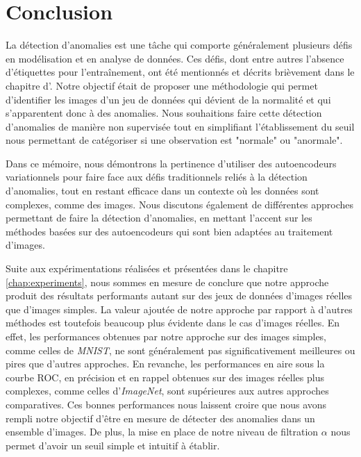 \chapter*{Conclusion}           %
\label{chap:conclusion}         %

La détection d'anomalies est une tâche qui comporte généralement plusieurs défis en modélisation et en analyse de données. Ces défis, dont entre autres l'absence d'étiquettes pour l'entraînement, ont été mentionnés et décrits brièvement dans le chapitre d'. Notre objectif était de proposer une méthodologie qui permet d'identifier les images d'un jeu de données qui dévient de la normalité et qui s'apparentent donc à des anomalies. Nous souhaitions faire cette détection d'anomalies de manière non supervisée tout en simplifiant l'établissement du seuil nous permettant de catégoriser si une observation est "normale" ou  "anormale". 

Dans ce mémoire, nous démontrons la pertinence d'utiliser des autoencodeurs variationnels pour faire face aux défis traditionnels reliés à la détection d'anomalies, tout en restant efficace dans un contexte où les données sont complexes, comme des images. Nous discutons également de différentes approches permettant de faire la détection d'anomalies, en mettant l'accent sur les méthodes basées sur des autoencodeurs qui sont bien adaptées au traitement d'images.

Suite aux expérimentations réalisées et présentées dans le chapitre \ref{chap:experiments}, nous sommes en mesure de conclure que notre approche produit des résultats performants autant sur des jeux de données d'images réelles que d'images simples. La valeur ajoutée de notre approche par rapport à d'autres méthodes est toutefois beaucoup plus évidente dans le cas d'images réelles. En effet, les performances obtenues par notre approche sur des images simples, comme celles de \textit{MNIST}, ne sont généralement pas significativement meilleures ou pires que d'autres approches. En revanche, les performances en aire sous la courbe ROC, en précision et en rappel obtenues sur des images réelles plus complexes, comme celles d'\textit{ImageNet}, sont supérieures aux autres approches comparatives. Ces bonnes performances nous laissent croire que nous avons rempli notre objectif d'être en mesure de détecter des anomalies dans un ensemble d'images. De plus, la mise en place de notre niveau de filtration $\alpha$ nous permet d'avoir un seuil simple et intuitif à établir.


